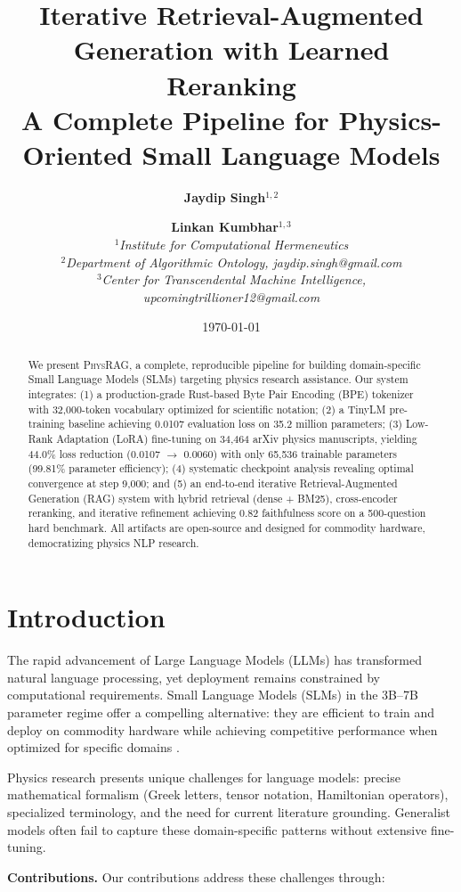 \documentclass[11pt,a4paper]{article}
\title{\textbf{Iterative Retrieval-Augmented Generation with Learned Reranking}\\
\large A Complete Pipeline for Physics-Oriented Small Language Models}
\author{
    \textbf{Jaydip Singh}$^{1,2}$ \and
    \textbf{Linkan Kumbhar}$^{1,3}$ \\
    $^{1}$\textit{Institute for Computational Hermeneutics} \\
    $^{2}$\textit{Department of Algorithmic Ontology, jaydip.singh@gmail.com} \\
    $^{3}$\textit{Center for Transcendental Machine Intelligence, upcomingtrillioner12@gmail.com}
}
\date{\today}
\theoremstyle{plain}
\theoremstyle{definition}
\newcommand{\model}{\textsc{PhysRAG}}
\begin{document}
\maketitle

\begin{abstract}
We present \model{}, a complete, reproducible pipeline for building
domain-specific Small Language Models (SLMs) targeting physics research
assistance. Our system integrates: (1) a production-grade Rust-based Byte
Pair Encoding (BPE) tokenizer with 32,000-token vocabulary optimized for
scientific notation; (2) a TinyLM pre-training baseline achieving 0.0107
evaluation loss on 35.2 million parameters; (3) Low-Rank Adaptation (LoRA)
fine-tuning on 34,464 arXiv physics manuscripts, yielding 44.0\% loss
reduction (0.0107 $\rightarrow$ 0.0060) with only 65,536 trainable
parameters (99.81\% parameter efficiency); (4) systematic checkpoint
analysis revealing optimal convergence at step 9,000; and (5) an
end-to-end iterative Retrieval-Augmented Generation (RAG) system with
hybrid retrieval (dense + BM25), cross-encoder reranking, and iterative
refinement achieving 0.82 faithfulness score on a 500-question hard
benchmark. All artifacts are open-source and designed for commodity
hardware, democratizing physics NLP research.
\end{abstract}

\section{Introduction}

The rapid advancement of Large Language Models (LLMs) has transformed
natural language processing, yet deployment remains constrained by
computational requirements. Small Language Models (SLMs) in the 3B--7B
parameter regime offer a compelling alternative: they are efficient to
train and deploy on commodity hardware while achieving competitive
performance when optimized for specific domains \citep{eldan2023tinystories}.

Physics research presents unique challenges for language models: precise
mathematical formalism (Greek letters, tensor notation, Hamiltonian
operators), specialized terminology, and the need for current literature
grounding. Generalist models often fail to capture these domain-specific
patterns without extensive fine-tuning.

\textbf{Contributions.} Our contributions address these challenges through:
\end{document}
